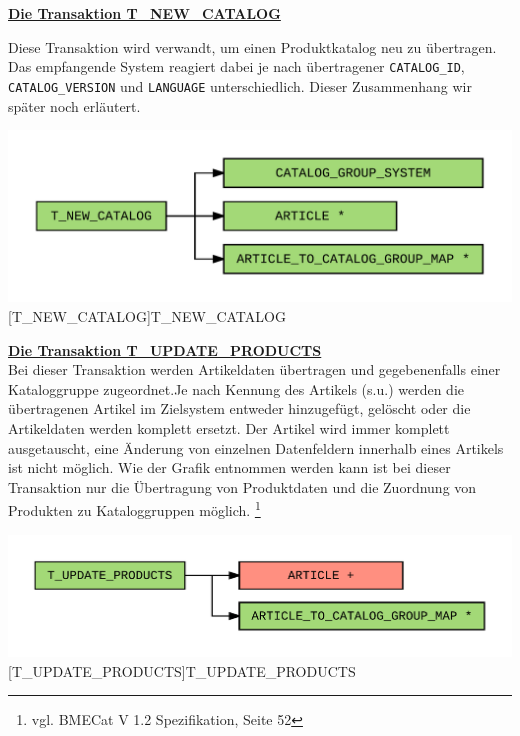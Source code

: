 	
	
	\textbf{\underline{Die Transaktion T\_NEW\_CATALOG}}
	
	Diese Transaktion wird verwandt, um einen Produktkatalog neu zu übertragen. Das empfangende System reagiert dabei je nach übertragener \texttt{CATALOG\_ID}, \texttt{CATALOG\_VERSION}
	und \texttt{LANGUAGE} unterschiedlich. Dieser Zusammenhang wir später noch erläutert.
	
	
	\begin{minipage}{\linewidth}
		\vspace{1em}
		\centering
		\includegraphics[width=0.8\linewidth]{img/newCatalog}
		[T\_NEW\_CATALOG]{T\_NEW\_CATALOG}
		\label{fig:header}
		\vspace{1em}
	\end{minipage}
	
	\textbf{\underline{Die Transaktion T\_UPDATE\_PRODUCTS}}\\
	
	Bei dieser Transaktion werden Artikeldaten übertragen und gegebenenfalls einer Kataloggruppe zugeordnet.Je nach Kennung des Artikels (s.u.)  werden die übertragenen
	Artikel im Zielsystem entweder hinzugefügt, gelöscht oder die Artikeldaten werden komplett ersetzt.
	Der Artikel wird immer komplett ausgetauscht, eine Änderung von einzelnen Datenfeldern innerhalb eines Artikels ist nicht möglich.
	Wie der Grafik entnommen werden kann ist bei dieser Transaktion nur die Übertragung von Produktdaten und die Zuordnung von Produkten zu Kataloggruppen möglich. \footnote{vgl. BMECat V 1.2 Spezifikation, Seite 52}
	
	\begin{minipage}{\linewidth}
		\vspace{1em}
		\centering
		\includegraphics[width=0.8\linewidth]{img/updateProducts}
		[T\_UPDATE\_PRODUCTS]{T\_UPDATE\_PRODUCTS}
		\label{fig:header}
		\vspace{1em}
	\end{minipage}
	
